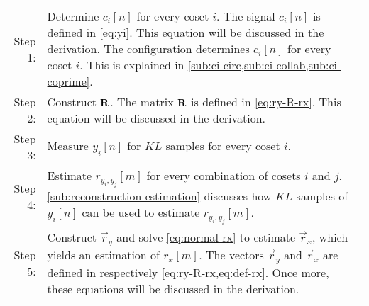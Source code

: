\documentclass[a4paper, openany, oneside]{memoir}
\begin{document}
\begin{tabularx}{\textwidth}{rY}
    Step 1: & Determine $c_i[n]$ for every coset $i$.
    \newline \newline
    The signal $c_i[n]$ is defined in \cref{eq:yi}. This equation will be discussed in the derivation. The configuration determines $c_i[n]$ for every coset $i$. This is explained in \cref{sub:ci-circ,sub:ci-collab,sub:ci-coprime}.
    \newline \\
    Step 2: & Construct $\boldsymbol{\mathbf{R}}$.
    \newline \newline
    The matrix $\boldsymbol{\mathbf{R}}$ is defined in \cref{eq:ry-R-rx}. This equation will be discussed in the derivation.
    \newline \\
    Step 3: & Measure $y_i[n]$ for $KL$ samples for every coset $i$. \newline \\
    Step 4: & Estimate $r_{y_i,y_j}[m]$ for every combination of cosets $i$ and $j$.
    \newline \newline
    \cref{sub:reconstruction-estimation} discusses how $KL$ samples of $y_i[n]$ can be used to estimate $r_{y_i,y_j}[m]$.
    \newline \\
    Step 5: & Construct $\vec{r}_y$ and solve \cref{eq:normal-rx} to estimate $\vec{r}_x$, which yields an estimation of $r_x[m]$.
    \newline \newline
    The vectors $\vec{r}_y$ and $\vec{r}_x$ are defined in respectively \cref{eq:ry-R-rx,eq:def-rx}. Once more, these equations will be discussed in the derivation.  \\
\end{tabularx}
\end{document}
